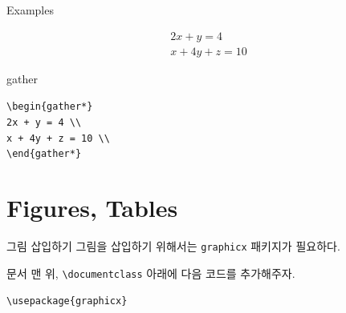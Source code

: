 \documentclass[12pt]{gshs_lecture}
\newenvironment{codeblock}[1]{
	\begin{block}{#1}
		\setstretch{1.0}
		\begin{small}
}{
		\end{small}
	\end{block}
}
\begin{document}
\begin{frame}[t]{Examples}
	
	\begin{gather*}
	2x + y = 4\\
	x + 4y + z = 10
	\end{gather*}
	
	\begin{codeblock}{gather}	
		\texttt{\textbackslash begin\{gather*\}}\\
		\hspace{6mm} \texttt{2x + y = 4 \textbackslash\textbackslash}\\
		\hspace{6mm} \texttt{x + 4y + z = 10 \textbackslash\textbackslash}\\
		\texttt{\textbackslash end\{gather*\}}
	\end{codeblock}
	
\end{frame}


\section{Figures, Tables}

\begin{frame}[t]{그림 삽입하기}
	그림을 삽입하기 위해서는 \texttt{graphicx} 패키지가 필요하다.
	
	문서 맨 위, \texttt{\textbackslash documentclass} 아래에 다음 코드를 추가해주자.
	
	\vskip 1pc
	
	\begin{codeblock}{}
		\texttt{\textbackslash usepackage\{graphicx\}}
	\end{codeblock}
\end{frame}
\end{document}
